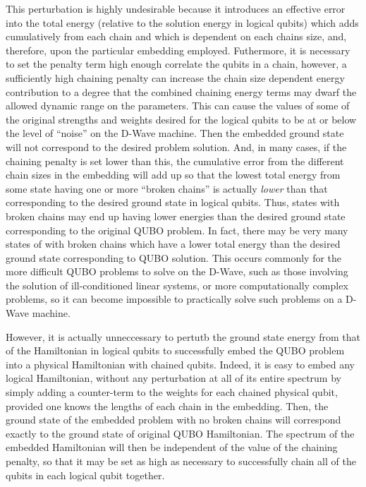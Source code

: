 \documentclass[preprint,12pt,eqsecnum,nofootinbib,amsmath,amssymb]{revtex4}
\begin{document}
This perturbation is highly undesirable because it introduces an effective error into the total energy 
(relative to the solution energy in logical qubits) which adds cumulatively from each chain 
and which is dependent on each chains size, and, therefore, upon the particular embedding employed.  
Futhermore, it is necessary to set the penalty term high enough correlate the qubits in a chain, 
however, a sufficiently high chaining penalty can increase the chain size dependent energy
contribution to a degree that the combined chaining energy terms may dwarf the allowed 
dynamic range on the parameters.  This can cause the values of some of the original strengths 
and weights desired for the logical qubits to be at or below the level of ``noise'' on the 
D-Wave machine. Then  the embedded ground state will not correspond to the desired problem 
solution. And, in many cases, if the chaining penalty is set lower than this, the cumulative 
error from the different chain sizes in the embedding will add up so that the lowest 
total energy from some state having one or more ``broken chains''  is actually {\em lower} than 
that corresponding to the desired ground state in logical qubits. Thus, states with broken chains
may end up having lower energies than the desired ground state corresponding to the original
QUBO problem. In fact, there may be very many states of with broken chains which have a lower total 
energy than the desired ground state corresponding to QUBO solution. This occurs commonly for the 
more difficult QUBO problems to solve on the D-Wave, such as those involving the solution of 
ill-conditioned linear systems, or more computationally complex problems, so it can become 
impossible to practically solve such problems on a D-Wave machine.

However, it is actually unneccessary to pertutb the ground state energy from that of the Hamiltonian 
in logical qubits to successfully embed the QUBO problem into a physical Hamiltonian with chained qubits.  
Indeed, it is easy to embed any logical Hamiltonian, without any perturbation at all of its 
entire spectrum by simply adding a counter-term to the weights for each chained physical qubit, provided
one knows the lengths of each chain in the embedding. Then, the ground state of the embedded problem
with no broken chains will correspond exactly to the ground state of original QUBO Hamiltonian. 
The spectrum of the embedded Hamiltonian will then be independent of the value of the 
chaining penalty, so that it may be set as high as necessary to successfully chain all of
the qubits in each logical qubit together.
\end{document}
